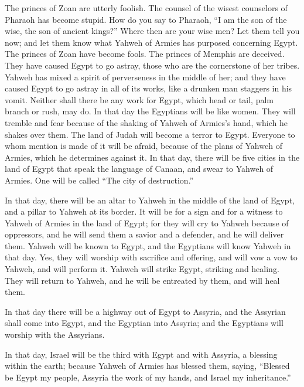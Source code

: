  The princes of Zoan are utterly foolish. The counsel of
the wisest counselors of Pharaoh has become stupid. How do you say to
Pharaoh, ``I am the son of the wise, the son of ancient kings?''
 Where then are your wise men? Let them tell you now; and
let them know what Yahweh of Armies has purposed concerning Egypt.
 The princes of Zoan have become fools. The princes of
Memphis are deceived. They have caused Egypt to go astray, those who are
the cornerstone of her tribes.  Yahweh has mixed a spirit
of perverseness in the middle of her; and they have caused Egypt to go
astray in all of its works, like a drunken man staggers in his vomit.
 Neither shall there be any work for Egypt, which head or
tail, palm branch or rush, may do.  In that day the
Egyptians will be like women. They will tremble and fear because of the
shaking of Yahweh of Armies's hand, which he shakes over them.
 The land of Judah will become a terror to Egypt. Everyone
to whom mention is made of it will be afraid, because of the plans of
Yahweh of Armies, which he determines against it.  In that
day, there will be five cities in the land of Egypt that speak the
language of Canaan, and swear to Yahweh of Armies. One will be called
``The city of destruction.''

 In that day, there will be an altar to Yahweh in the
middle of the land of Egypt, and a pillar to Yahweh at its border.
 It will be for a sign and for a witness to Yahweh of
Armies in the land of Egypt; for they will cry to Yahweh because of
oppressors, and he will send them a savior and a defender, and he will
deliver them.  Yahweh will be known to Egypt, and the
Egyptians will know Yahweh in that day. Yes, they will worship with
sacrifice and offering, and will vow a vow to Yahweh, and will perform
it.  Yahweh will strike Egypt, striking and healing. They
will return to Yahweh, and he will be entreated by them, and will heal
them.

 In that day there will be a highway out of Egypt to
Assyria, and the Assyrian shall come into Egypt, and the Egyptian into
Assyria; and the Egyptians will worship with the Assyrians.

 In that day, Israel will be the third with Egypt and with
Assyria, a blessing within the earth;  because Yahweh of
Armies has blessed them, saying, ``Blessed be Egypt my people, Assyria
the work of my hands, and Israel my inheritance.''

